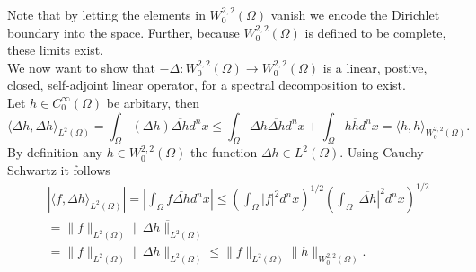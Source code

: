 \documentclass[A4,12pt,twoside]{book}
\begin{document}
Note that by letting the elements in $W_{0}^{2,2} (\Omega)$ vanish we encode the Dirichlet boundary into the space. Further, because $W_0^{2,2}(\Omega)$ is defined to be complete, these limits exist.\\
We now want to show that $-\Delta: W_0^{2,2}(\Omega) \to W_0^{2,2}(\Omega)$ is a linear, postive, closed, self-adjoint linear operator, for a spectral decomposition to exist.\\
Let $h \in C_0^\infty (\Omega)$ be arbitary, then 
\[
\langle \Delta h ,\Delta h \rangle_{L^2 (\Omega)} = \int_\Omega (\Delta h) \overline{\Delta h} d^n x \leq \int_\Omega \Delta h \overline{\Delta h} d^n x + \int_\Omega h \overline{h} d^n x = \langle h,h \rangle_{W_0^{2,2}(\Omega)}.
\]
By definition any $h \in W_0^{2,2}(\Omega)$ the function $\Delta h \in L^2 (\Omega)$. Using Cauchy Schwartz it follows 
\begin{align*}
    &| \langle f, \Delta h \rangle_{L^2 (\Omega)}| = | \int_\Omega f  \overline{\Delta h} d^n x | \leq (\int_\Omega |f|^2 d^n x)^{1/2}  ( \int_\Omega  |\overline{\Delta h}|^2 d^n x)^{1/2} \\
    &= \| f \|_{L^2 (\Omega)} \overline{\| \Delta h \|_{L^2 (\Omega)}} \\
    &=  \| f \|_{L^2 (\Omega)} \| \Delta h \|_{L^2 (\Omega)} \leq \| f \|_{L^2 (\Omega)} \| h \|_{W_0^{2,2} (\Omega)} .
\end{align*}
\end{document}

